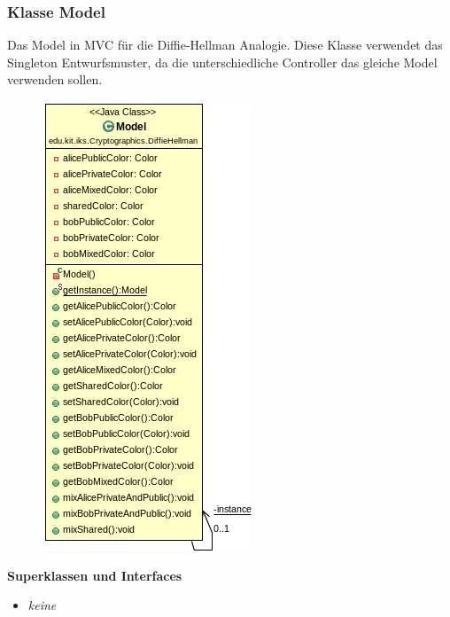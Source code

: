 \documentclass{article}
\begin{document}
  \subsubsection{Klasse Model}
      Das Model in MVC für die Diffie-Hellman Analogie.
      Diese Klasse verwendet das Singleton Entwurfsmuster,
      da die unterschiedliche Controller das gleiche Model verwenden sollen.

      \begin{figure}[H]
        \centering
        \includegraphics{resources/edu-kit-iks-Cryptographics-DiffieHellman-Model}
      \end{figure}

      \textbf{Superklassen und Interfaces}
      \begin{itemize}
        \item \textit{keine}
      \end{itemize}
\end{document}
